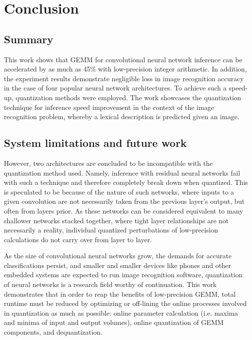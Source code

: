 \chapter{Conclusion}

\section{Summary}
This work shows that GEMM for convolutional neural network inference can be accelerated by as much as 45\% with low-precision integer arithmetic. In addition, the experiment results demonstrate negligible loss in image recognition accuracy in the case of four popular neural network architectures. To achieve such a speed-up, quantization methods were employed. The work showcases the quantization technique for inference speed improvement in the context of the image recognition problem, whereby a lexical description is predicted given an image.

\section{System limitations and future work}
However, two architectures are concluded to be incompatible with the quantization method used. Namely, inference with residual neural networks fail with such a technique and therefore completely break down when quantized. This is speculated to be because of the nature of such networks, where inputs to a given convolution are not necessarily taken from the previous layer's output, but often from layers prior. As these networks can be considered equivalent to many shallower networks stacked together, where tight layer relationships are not necessarily a reality, individual quantized perturbations of low-precision calculations do not carry over from layer to layer.

As the size of convolutional neural networks grow, the demands for accurate classifications persist, and smaller and smaller devices like phones and other embedded systems are expected to run image recognition software, quantization of neural networks is a research field worthy of continuation. This work demonstrates that in order to reap the benefits of low-precision GEMM, total runtime must be reduced by optimizing or off-lining the online processes involved in quantization as much as possible: online parameter calculation (i.e. maxima and minima of input and output volumes), online quantization of GEMM components, and dequantization.